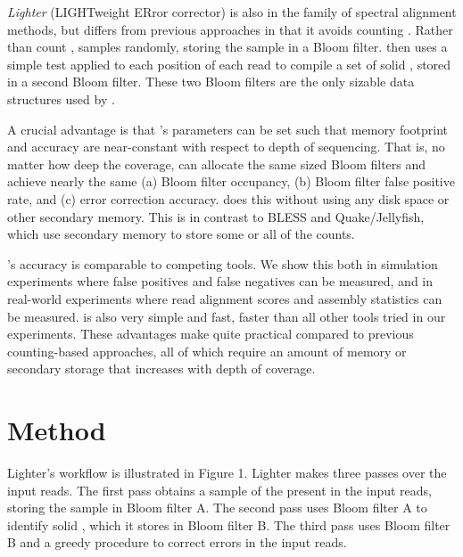 \documentclass{bmcart}
\begin{document}
\emph{Lighter} (LIGHTweight ERror corrector) is also in the family of spectral alignment methods, but differs from previous approaches in that it avoids counting \kmers.
Rather than count \kmers, \tool samples \kmers randomly, storing the sample in a Bloom filter.
\tool then uses a simple test applied to each position of each read to compile a set of solid \kmers, stored in a second Bloom filter.
These two Bloom filters are the only sizable data structures used by \tool.

A crucial advantage is that \tool's parameters can be set such that memory footprint and accuracy are near-constant with respect to depth of sequencing.
That is, no matter how deep the coverage, \tool can allocate the same sized Bloom filters and achieve nearly the same (a) Bloom filter occupancy, (b) Bloom filter false positive rate, and (c) error correction accuracy.
\tool does this without using any disk space or other secondary memory.
This is in contrast to BLESS and Quake/Jellyfish, which use secondary memory to store some or all of the \kmer counts.

\tool's accuracy is comparable to competing tools.  We show this both in simulation experiments where false positives and false negatives can be measured, and in real-world experiments where read alignment scores and assembly statistics can be measured.  
\tool is also very simple and fast, faster than all other tools tried in our experiments.
These advantages make \tool quite practical compared to previous counting-based approaches, all of which require an amount of memory or secondary storage that increases with depth of coverage.

\section*{Method}
Lighter's workflow is illustrated in Figure 1. Lighter makes three passes over the input reads.  The first pass obtains a sample of the \kmers present in the input reads, storing the sample in Bloom filter A.  The second pass uses Bloom filter A to identify solid \kmers, which it stores in Bloom filter B.  The third pass uses Bloom filter B and a greedy procedure to correct errors in the input reads.
\end{document}
